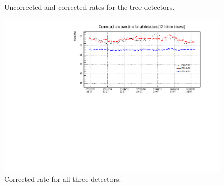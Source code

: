 \documentclass[prX, twocolumn, a4paper]{revtex4}
\begin{document}
\begin{figure}
    \hspace{0.5cm}
    \caption{Uncorrected and corrected rates for the tree detectors.}
\end{figure}

\begin{figure}
    \centering
    \includegraphics[width =0.9\linewidth]{figures/all_corr3.pdf}
    \caption{Corrected rate for all three detectors.}
    \label{fig:corr_all}
\end{figure}
\end{document}
